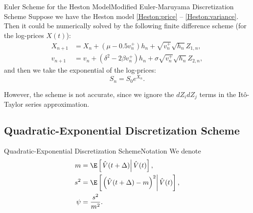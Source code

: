 \begin{frame}{Euler Scheme for the Heston Model}{Modified Euler-Maruyama Discretization Scheme}
    Suppose we have the Heston model \eqref{Heston:price} -- \eqref{Heston:variance}. Then it could be numerically solved by the following finite difference scheme (for the log-prices $X(t)$):
    \begin{align}
        X_{n+1} & = X_n + (\mu - 0.5 v_n^+)h_n + \sqrt{v_n^+} \sqrt{h_n} Z_{1,n}, \label{Euler:Heston:price:posmod}\\
        v_{n+1} & = v_n + \left(\delta^2 - 2\beta v_n^+\right) h_n + \sigma \sqrt{v_n^+} \sqrt{h_n} Z_{2,n}, \label{Euler:Heston:variance:posmod}
    \end{align}
    and then we take the exponential of the log-prices:
    \begin{equation}
        S_{n} = S_0 e^{X_{n}}.
    \end{equation}
    
    However, the scheme is not accurate, since we ignore the $dZ_idZ_j$ terms in the It\^o-Taylor series approximation.
\end{frame}

\subsection{Quadratic-Exponential Discretization Scheme}
    \begin{frame}{Quadratic-Exponential Discretization Scheme}{Notation}\label{frame:Andersen:denotemeanstd}
        We denote 
        \begin{align}
            m    &= \E\left[\left.\hat{V}(t+\Delta)\right| \hat{V}(t)\right], \\
            s^2  &= \E\left[\left.\left(\hat{V}(t+\Delta) - m\right)^2\right| \hat{V}(t)\right], \\
            \psi &= \frac{s^2}{m^2}.
        \end{align}
    \end{frame}

